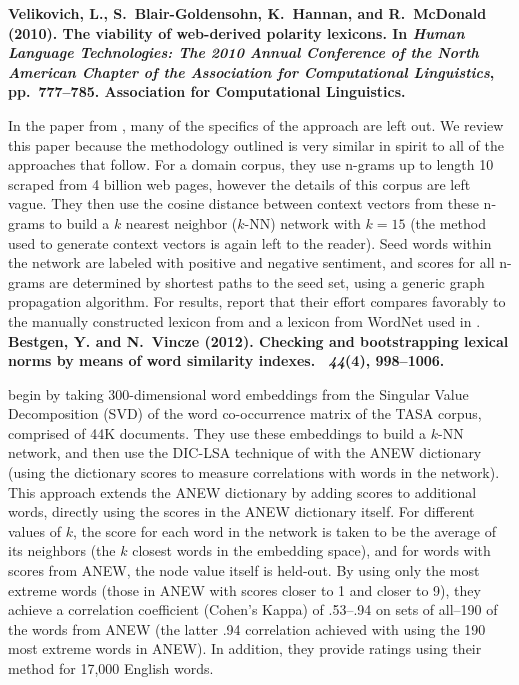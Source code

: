 {\noindent \textbf{Velikovich, L., S.~Blair-Goldensohn, K.~Hannan, and R.~McDonald (2010).
\newblock The viability of web-derived polarity lexicons.
\newblock In {\em Human Language Technologies: The 2010 Annual Conference of
  the North American Chapter of the Association for Computational Linguistics},
  pp.\  777--785. Association for Computational Linguistics.}

\noindent In the paper from \cite{velikovich2010viability}, many of the specifics of the approach are left out.
We review this paper because the methodology outlined is very similar in spirit to all of the approaches that follow.
For a domain corpus, they use n-grams up to length 10 scraped from 4 billion web pages, however the details of this corpus are left vague.
They then use the cosine distance between context vectors from these n-grams to build a $k$ nearest neighbor ($k$-NN) network with $k=15$ (the method used to generate context vectors is again left to the reader).
Seed words within the network are labeled with positive and negative sentiment, and scores for all n-grams are determined by shortest paths to the seed set, using a generic graph propagation algorithm.
For results, \cite{velikovich2010viability} report that their effort compares favorably to the manually constructed lexicon from \cite{wilson2005recognizing} and a lexicon from WordNet used in \cite{blair2008building}.\\

\noindent \textbf{Bestgen, Y. and N.~Vincze (2012).
\newblock Checking and bootstrapping lexical norms by means of word similarity
  indexes.
~{\em 44\/}(4), 998--1006.}

\noindent \cite{bestgen2012checking} begin by taking 300-dimensional word embeddings from the Singular Value Decomposition (SVD) of the word co-occurrence matrix of the TASA corpus, comprised of 44K documents.
They use these embeddings to build a $k$-NN network, and then use the DIC-LSA technique of \cite{bestgen2008building} with the ANEW dictionary (using the dictionary scores to measure correlations with words in the network).
This approach extends the ANEW dictionary by adding scores to additional words, directly using the scores in the ANEW dictionary itself.
For different values of $k$, the score for each word in the network is taken to be the average of its neighbors (the $k$ closest words in the embedding space), and for words with scores from ANEW, the node value itself is held-out.
By using only the most extreme words (those in ANEW with scores closer to 1 and closer to 9), they achieve a correlation coefficient (Cohen's Kappa) of .53--.94 on sets of all--190 of the words from ANEW (the latter .94 correlation achieved with using the 190 most extreme words in ANEW).
In addition, they provide ratings using their method for 17,000 English words.\\

}
